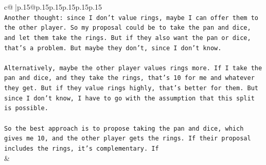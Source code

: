 \documentclass{article}
\begin{document}
{\begin{supertabular}{c@{$\;$}|p{.15\linewidth}@{}p{.15\linewidth}p{.15\linewidth}p{.15\linewidth}p{.15\linewidth}p{.15\linewidth}}
{{{\\ 
\texttt{Another thought: since I don't value rings, maybe I can offer them to the other player. So my proposal could be to take the pan and dice, and let them take the rings. But if they also want the pan or dice, that's a problem. But maybe they don't, since I don't know.} \\
\\ 
\texttt{Alternatively, maybe the other player values rings more. If I take the pan and dice, and they take the rings, that's 10 for me and whatever they get. But if they value rings highly, that's better for them. But since I don't know, I have to go with the assumption that this split is possible.} \\
\\ 
\texttt{So the best approach is to propose taking the pan and dice, which gives me 10, and the other player gets the rings. If their proposal includes the rings, it's complementary. If} \\
            }
        }
    }
    & \\ \\


\end{supertabular}}
\end{document}
